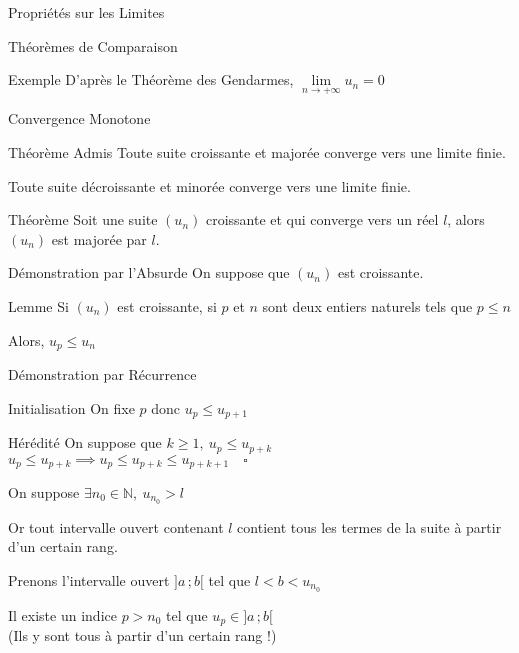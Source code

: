 \documentclass{cours}
\begin{document}
\begin{Gpartie}{Propriétés sur les Limites}
\begin{Spartie}{Théorèmes de Comparaison}
\begin{SSpartie}{Exemple}
                D'après le Théorème des Gendarmes, $\lim\limits_{n\to +\infty}u_n=0$
            \end{SSpartie}
        \end{Spartie}
        \pagebreak
        \begin{Spartie}{Convergence Monotone} 
            \begin{SSpartie}{Théorème Admis} 
                Toute suite croissante et majorée converge vers une limite finie.

                Toute suite décroissante et minorée converge vers une limite finie.
            \end{SSpartie}
            \begin{SSpartie}{Théorème} 
                Soit une suite $(u_n)$ croissante et qui converge vers un réel $l$, alors $(u_n)$ est majorée par $l$.
            \end{SSpartie}
            \begin{SSpartie}{Démonstration par l'Absurde} 
                On suppose que $(u_n)$ est croissante.
                \begin{SSSpartie}{Lemme} 
                    Si $(u_n)$ est croissante, si $p$ et $n$ sont deux entiers naturels tels que $p\leq n$

                    Alors, $u_p\leq u_n$
                \end{SSSpartie}
                \begin{SSSpartie}{Démonstration par Récurrence}
                    \begin{SSSSpartie}{Initialisation}
                        On fixe $p$ donc $u_p\leq u_{p+1}$
                    \end{SSSSpartie}
                    \begin{SSSSpartie}{Hérédité}
                        On suppose que $k\geq 1,\ u_p\leq u_{p+k}$
                        $u_p\leq u_{p+k}\implies u_p\leq u_{p+k}\leq u_{p+k+1}\quad\square$
                    \end{SSSSpartie}    
                \end{SSSpartie}
                On suppose $\exists n_0\in\mathbb{N},\ u_{n_0}>l$

                Or tout intervalle ouvert contenant $l$ contient tous les termes de la suite à partir d'un certain rang.

                Prenons l'intervalle ouvert $\big]a\,;b\big[$ tel que $l<b<u_{n_0}$

                Il existe un indice $p>n_0$ tel que $u_p\in\big]a\,;b\big[$ \\ (Ils y sont tous à partir d'un certain rang !)


\end{SSpartie}
\end{Spartie}
\end{Gpartie}
\end{document}
